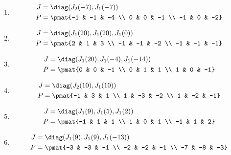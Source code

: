 \begin{enumerate}
\item

\begin{align*}
J &= \diag(J_{2}(-7), J_{1}(-7))\\
P &= \pmat{-1 & -1 & -4 \\ 0 & 0 & -1 \\ -1 & 0 & -2}
\end{align*}

\item

\begin{align*}
J &= \diag(J_{1}(20), J_{1}(20), J_{1}(0))\\
P &= \pmat{2 & 1 & 3 \\ -1 & -1 & -2 \\ -1 & -1 & -1}
\end{align*}

\item

\begin{align*}
J &= \diag(J_{1}(20), J_{1}(-4), J_{1}(-14))\\
P &= \pmat{0 & 0 & -1 \\ 0 & 1 & 1 \\ 1 & 0 & -1}
\end{align*}

\item

\begin{align*}
J &= \diag(J_{2}(10), J_{1}(10))\\
P &= \pmat{-1 & 3 & 1 \\ 1 & -3 & -2 \\ 1 & -2 & -1}
\end{align*}

\item

\begin{align*}
J &= \diag(J_{1}(9), J_{1}(5), J_{1}(2))\\
P &= \pmat{-1 & 1 & 1 \\ 1 & 0 & 1 \\ -1 & 1 & 2}
\end{align*}

\item

\begin{align*}
J &= \diag(J_{1}(9), J_{1}(9), J_{1}(-13))\\
P &= \pmat{-3 & -3 & -1 \\ -2 & -2 & -1 \\ -7 & -8 & -3}
\end{align*}


\end{enumerate}
